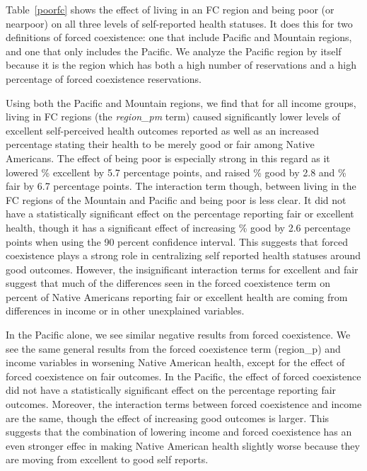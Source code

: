 \documentclass[12pt]{article}
\begin{document}
Table~\ref{poorfc} shows the effect of living in an FC region and being poor (or nearpoor) on all three levels of self-reported health statuses. It does this for two definitions of forced coexistence: one that include Pacific and Mountain regions, and one that only includes the Pacific.
We analyze the Pacific region by itself because it is the region which has both a high number of reservations and a high percentage of forced coexistence reservations.

Using both the Pacific and Mountain regions, we find that for all income groups, living in FC regions (the \emph{region\_pm} term) caused significantly lower levels of excellent self-perceived health outcomes reported as well as an increased percentage stating their health to be merely good or fair among Native Americans. 
The effect of being poor is especially strong in this regard as it lowered \% excellent by 5.7 percentage points, and raised \% good by 2.8 and \% fair by 6.7 percentage points.
The interaction term though, between living in the FC regions of the Mountain and Pacific and being poor is less clear.
It did not have a statistically significant effect on the percentage reporting fair or excellent health, though it has a significant effect of increasing \% good by 2.6 percentage points when using the 90 percent confidence interval.
This suggests that forced coexistence plays a strong role in centralizing self reported health statuses around good outcomes. 
However, the insignificant interaction terms for excellent and fair suggest that much of the differences seen in the forced coexistence term on percent of Native Americans reporting fair or excellent health are coming from differences in income or in other unexplained variables.  

In the Pacific alone, we see similar negative results from forced coexistence. 
We see the same general results from the forced coexistence term (region\_p) and income variables in worsening Native American health, except for the effect of forced coexistence on fair outcomes.
In the Pacific, the effect of forced coexistence did not have a statistically significant effect on the percentage reporting fair outcomes. 
Moreover, the interaction terms between forced coexistence and income are the same, though the effect of increasing good outcomes is larger. 
This suggests that the combination of lowering income and forced coexistence has an even stronger effec in making Native American health slightly worse because they are moving from excellent to good self reports.
\end{document}
